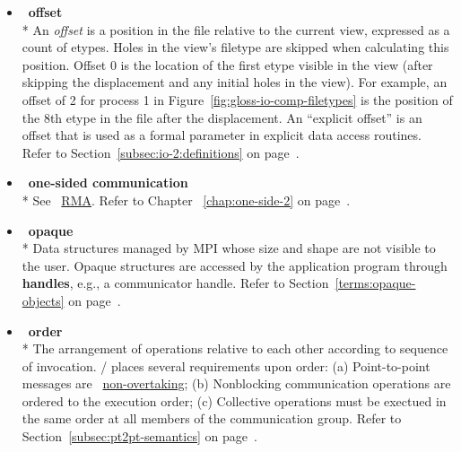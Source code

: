 \begin{itemize}
\label{glossary:offset}
\item  ~\hypertarget{glossary:offset}{\textbf{offset}} \\*
An {\it offset} is a position
in the file
relative to the current view,
expressed as a count of etypes.
Holes in the view's filetype are skipped when calculating this position.
Offset 0 is the location of the first etype visible in the view
(after skipping the displacement and any initial holes in the view).
For example, an offset of 2 for process 1
in Figure~\ref{fig:gloss-io-comp-filetypes} is the position
of the 8th etype in the file after the displacement.
An ``explicit offset'' is an offset that is used as a formal parameter
in explicit data access routines.
Refer to Section~\ref{subsec:io-2:definitions} on page~\pageref{subsec:io-2:definitions}.

\label{glossary:one-sided_communication}
\item  ~\hypertarget{glossary:one-sided_communication}{\textbf{one-sided communication}} \\*
See ~\hyperlink{glossary:RMA}{RMA}.
Refer to Chapter ~\ref{chap:one-side-2} on page~\pageref{chap:one-side-2}.


\label{glossary:opaque}
\item  ~\hypertarget{glossary:opaque}{\textbf{opaque}} \\*
Data structures managed by MPI whose size and shape are not visible to the user. 
Opaque structures are accessed by the application program through {\bf handles}, e.g., a communicator handle. 
Refer to Section~\ref{terms:opaque-objects} on page~\pageref{terms:opaque-objects}.

\label{glossary:order}
\item  ~\hypertarget{glossary:order}{\textbf{order}} \\*
The arrangement of operations relative to each other according to sequence of invocation.
\MPI/ places several requirements upon order: (a) Point-to-point messages are ~\hyperlink{glossary:non-overtaking}{non-overtaking};
(b) Nonblocking communication operations are ordered to the execution order;
(c) Collective operations must be exectued in the same order at all members of the communication group.
Refer to Section~\ref{subsec:pt2pt-semantics} on page~\pageref{subsec:pt2pt-semantics}.


\end{itemize}
